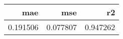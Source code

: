 \begin{tabular}{rrr}
\toprule
     mae &      mse &       r2 \\
\midrule
0.191506 & 0.077807 & 0.947262 \\
\bottomrule
\end{tabular}
